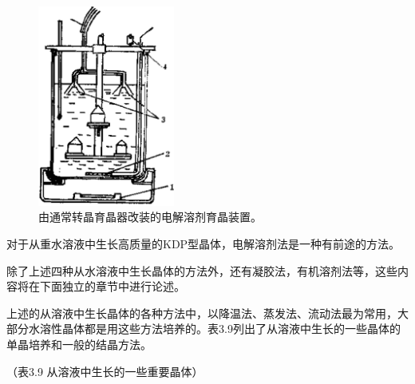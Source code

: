 \begin{figure}[h]
 \centering
 \includegraphics[width=0.4\textwidth]{fig/cp03/img3.26.jpg}
 \caption{由通常转晶育晶器改装的电解溶剂育晶装置。}
\end{figure}

对于从重水溶液中生长高质量的KDP型晶体，电解溶剂法是一种有前途的方法。

除了上述四种从水溶液中生长晶体的方法外，还有凝胶法，有机溶剂法等，这些内容将在下面独立的章节中进行论述。

上述的从溶液中生长晶体的各种方法中，以降温法、蒸发法、流动法最为常用，大部分水溶性晶体都是用这些方法培养的。表3.9列出了从溶液中生长的一些晶体的单晶培养和一般的结晶方法。

（表3.9  从溶液中生长的一些重要晶体）

